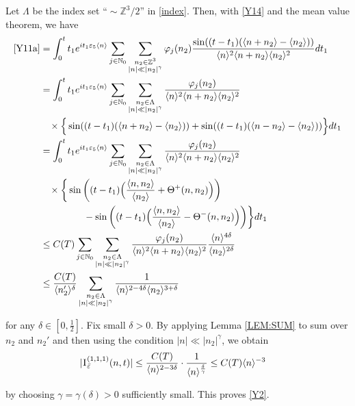 \documentclass[%
11pt,  reqno]{amsart}
\newcommand{\1}{\hspace{0.2mm}\text{I}\hspace{0.2mm}}
\newcommand{\noi}{\noindent}
\newcommand{\Z}{\mathbb{Z}}
\newcommand{\dl}{\delta}
\newcommand{\eps}{\varepsilon}
\newcommand{\g}{\gamma}
\newcommand{\Ld}{\Lambda}
\newcommand{\jb}[1]
{\langle #1 \rangle}
\newcommand{\N}{\mathbb{N}}
\numberwithin{equation}{section}
\numberwithin{theorem}{section}
\begin{document}
\noi
Let $\Ld$ be the index set $\text{``}\sim \Z^3 / 2\text{''}$
in \eqref{index}.
Then, with \eqref{Y14} and the mean value theorem, we have
\begin{align*}
\begin{split}
\eqref{Y11a} &
 =   
 \int_0^t  t_1  e^{ i t_1 \eps_5\jb{n}}
\sum_{j \in \N_0}
\sum_{\substack{n_2 \in \Z^3\\|n| \ll |n_2|^\g}}\varphi_j(n_2)
\frac{\sin ((t - t_1) (\jb{n+ n_2} - \jb{n_2}) )}{\jb{n}^2 \jb{n+n_2} \jb{n_2}^2 }
 dt_1\\
& =    \int_0^t  t_1  e^{ i t_1 \eps_5\jb{n}}
\sum_{j \in \N_0}
\sum_{\substack{n_2 \in \Ld\\|n| \ll |n_2|^\g}}\frac{\varphi_j(n_2)}
{\jb{n}^2 \jb{n+n_2} \jb{n_2}^2 }\\
& \hphantom{X}
\times
\Big\{ \sin ((t - t_1) (\jb{n+ n_2} - \jb{n_2}) )
+ \sin ((t - t_1) (\jb{n- n_2} - \jb{n_2}) )\Big\}
 dt_1\\
& =    \int_0^t  t_1  e^{ i t_1 \eps_5\jb{n}}
\sum_{j \in \N_0}
\sum_{\substack{n_2 \in \Ld\\|n| \ll |n_2|^\g}}\frac{\varphi_j(n_2)}{\jb{n}^2 \jb{n+n_2} \jb{n_2}^2 }\\
& \hphantom{X}
\times
   \bigg\{
\sin \bigg((t - t_1)\Big(  \frac{\jb{n, n_2}}{\jb{n_2}} + \Theta^+(n, n_2)\Big)\bigg) \\
& \hphantom{XXXXX}
- \sin \bigg((t - t_1)\Big(  \frac{\jb{n, n_2}}{\jb{n_2}} - \Theta^-(n, n_2)\Big)\bigg)
 \bigg\} dt_1
\\
 & \leq C(T) 
\sum_{j \in \N_0}
\sum_{\substack{n_2 \in \Ld\\|n| \ll |n_2|^\g}}\frac{\varphi_j(n_2)}{\jb{n}^2 \jb{n+n_2} \jb{n_2}^2 }
\frac{\jb{n}^{4\dl}}{\jb{n_2}^{2\dl}}\\
 & \leq \frac{C(T)}{\jb{n_2'}^{\dl}}
\sum_{\substack{n_2 \in \Ld\\|n| \ll |n_2|^\g}}\frac{1}{\jb{n}^{2-4\dl} \jb{n_2}^{3+\dl} }
\end{split}
\end{align*}

\noi
for any $\dl\in  [0, \frac 12]$.
Fix small $\dl > 0$. 
By applying  Lemma \ref{LEM:SUM} to sum over $n_2$
and $n_2'$
and then using the condition $|n| \ll |n_2|^\g$, we obtain
\begin{align*}
|\1^{(1,1,1)}_{\bar \eps} (n,t)|
& \le \frac{C(T)}{\jb{n}^{2-3\dl}} \cdot \frac{1}{\jb{n}^{\frac{\dl}{\g}}}
\le C(T){\jb{n}^{-3}}
\end{align*}

\noi
by choosing $\g = \g(\dl)> 0$ sufficiently small.
This proves \eqref{Y2}.
\end{document}
